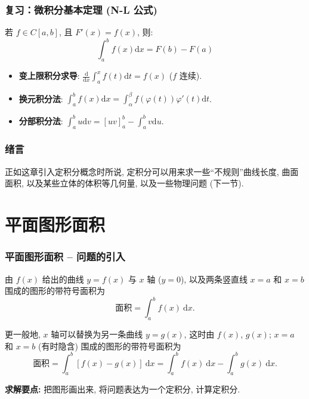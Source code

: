 \begin{frame}
\frametitle{复习：微积分基本定理 (N-L 公式)}
\begin{thm}[微积分基本定理]
若 $f \in C[a,b]$, 且 $F'(x)=f(x)$, 则:
\[ \int_a^b f(x) \mathrm{d}x = F(b) - F(a) \]
\end{thm}
\begin{itemize}
    \item \textbf{变上限积分求导}: $\frac{\mathrm{d}}{\mathrm{d}x} \int_a^x f(t) \mathrm{d}t = f(x)$ ($f$ 连续).
    \item \textbf{换元积分法}: $\int_a^b f(x) \mathrm{d}x = \int_\alpha^\beta f(\varphi(t)) \varphi'(t) \mathrm{d}t$.
    \item \textbf{分部积分法}: $\int_a^b u \mathrm{d}v = [uv]_a^b - \int_a^b v \mathrm{d}u$.
\end{itemize}
\end{frame}


\begin{frame}
\frametitle{绪言}

{
\larger[2]

正如这章引入定积分概念时所说, 定积分可以用来求一些``不规则''曲线长度, 曲面面积, 以及某些立体的体积等几何量, 以及一些物理问题 (下一节).

}

\end{frame}


\section{平面图形面积}


\begin{frame}
\frametitle{平面图形面积 -- 问题的引入}

\begin{recall}[定积分定义]
由 $f(x)$ 给出的曲线 $y=f(x)$ 与 $x$ 轴 ($y = 0$), 以及两条竖直线 $x=a$ 和 $x=b$ 围成的图形的\alert{带符号}面积为
\[
\text{面积} = \int_a^b f(x) ~ \mathrm{d} x.
\]
\end{recall}

\pause

更一般地, $x$ 轴可以替换为另一条曲线 $y=g(x)$, 这时由 $f(x)$, $g(x)$; $x=a$ 和 $x=b$ (有时隐含) 围成的图形的带符号面积为
\[
\text{面积} = \int_a^b [f(x) - g(x)] ~ \mathrm{d} x = \int_a^b f(x) ~ \mathrm{d} x - \int_a^b g(x) ~ \mathrm{d} x.
\]

\pause

\textbf{求解要点:} 把图形画出来, 将问题表达为一个定积分, 计算定积分.

\end{frame}

